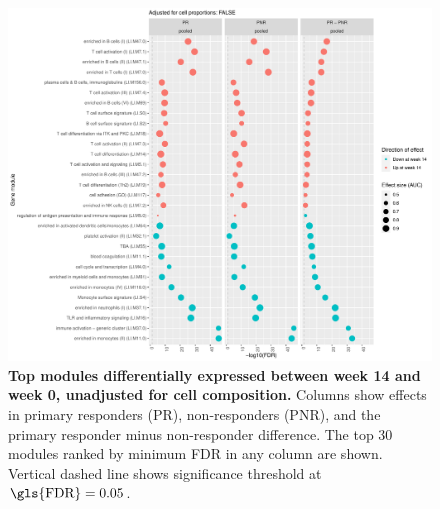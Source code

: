 \begin{figure}
    \centering
    \includegraphics[width=1.0\textwidth,page=1]{mainmatter/figures/chapter_04/plot_gene_set_enrichment.tmodCERNO_panelplot_reversed_C_3R_1R,C_3N_1N,C_(3R_1R)_(3N_1N).cell_prop_correction_FALSE.pdf}
    \caption[
    ]{
        \textbf{Top modules differentially expressed between week 14 and week 0, unadjusted for cell composition.}
        Columns show effects in primary responders (PR), non-responders (PNR), and the primary responder minus non-responder difference. 
        The top 30 modules ranked by minimum \gls{FDR} in any column are shown. 
        Vertical dashed line shows significance threshold at $\text{\gls{FDR}} = 0.05$.
    }
    \label{fig:multipants_dge_panelPlot_week_14_0_R_N_cellPropF}
\end{figure}


